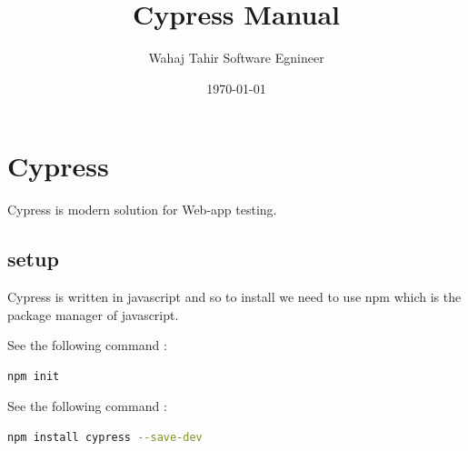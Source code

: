 \documentclass[a4paper,12pt]{article}
\title{Cypress Manual}
\author{Wahaj Tahir Software Egnineer}
\date{\today}
\begin{document}
\maketitle
\tableofcontents
\newpage
\section{Cypress}
Cypress is modern solution for Web-app testing.
\subsection{setup}
Cypress is written in javascript and so to install we need to use npm which is the package manager of javascript.

\noindent See the following command :
\begin{lstlisting}[language=bash]
  npm init
\end{lstlisting}
\noindent See the following command :
\begin{lstlisting}[language=bash]
  npm install cypress --save-dev
\end{lstlisting}
\end{document}
